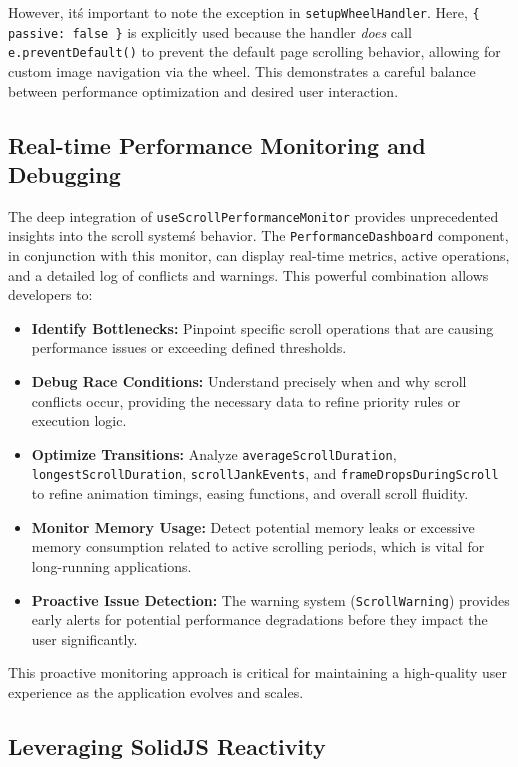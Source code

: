 \documentclass[10pt]{article}
\begin{document}
However, it\'s important to note the exception in \texttt{setupWheelHandler}. Here, \texttt{\{ passive: false \}} is explicitly used because the handler \textit{does} call \texttt{e.preventDefault()} to prevent the default page scrolling behavior, allowing for custom image navigation via the wheel. This demonstrates a careful balance between performance optimization and desired user interaction.

\subsection{Real-time Performance Monitoring and Debugging}

The deep integration of \texttt{useScrollPerformanceMonitor} provides unprecedented insights into the scroll system\'s behavior. The \texttt{PerformanceDashboard} component, in conjunction with this monitor, can display real-time metrics, active operations, and a detailed log of conflicts and warnings. This powerful combination allows developers to:
\begin{itemize}
    \item \textbf{Identify Bottlenecks:} Pinpoint specific scroll operations that are causing performance issues or exceeding defined thresholds.
    \item \textbf{Debug Race Conditions:} Understand precisely when and why scroll conflicts occur, providing the necessary data to refine priority rules or execution logic.
    \item \textbf{Optimize Transitions:} Analyze \texttt{averageScrollDuration}, \texttt{longestScrollDuration}, \texttt{scrollJankEvents}, and \texttt{frameDropsDuringScroll} to refine animation timings, easing functions, and overall scroll fluidity.
    \item \textbf{Monitor Memory Usage:} Detect potential memory leaks or excessive memory consumption related to active scrolling periods, which is vital for long-running applications.
    \item \textbf{Proactive Issue Detection:} The warning system (\texttt{ScrollWarning}) provides early alerts for potential performance degradations before they impact the user significantly.
\end{itemize}
This proactive monitoring approach is critical for maintaining a high-quality user experience as the application evolves and scales.

\subsection{Leveraging SolidJS Reactivity}
\end{document}
